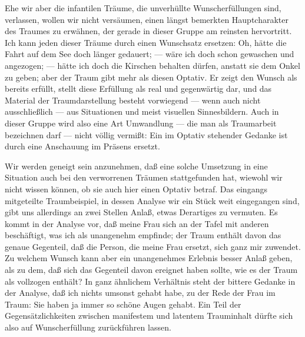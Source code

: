 \documentclass[twoside=true,titlepage=false,open=any, parskip=never, fontsize=10pt, headings=small, chapterprefix=false, appendixprefix=false]{scrbook}
\begin{document}
         
            
            
            
        \pstart
        Ehe wir aber die infantilen Träume, die unverhüllte Wunscherfüllungen
               sind, verlassen, wollen wir nicht versäumen, einen längst bemerkten
               Hauptcharakter des Traumes zu erwähnen, der gerade in dieser Gruppe am reinsten
               hervortritt. Ich kann jeden dieser Träume durch einen Wunschsatz ersetzen: Oh,
               hätte die Fahrt auf dem See doch länger gedauert; — wäre ich doch schon
               gewaschen und angezogen; — hätte ich doch die Kirschen behalten dürfen, anstatt
               sie dem Onkel zu geben; aber der Traum gibt mehr als diesen Optativ. Er zeigt
               den Wunsch als bereits erfüllt, stellt diese Erfüllung als real und gegenwärtig
               dar, und das Material der Traumdarstellung besteht vorwiegend — wenn auch
               nicht ausschließlich — aus Situationen und meist visuellen Sinnesbildern. Auch
               in dieser Gruppe wird also eine Art Umwandlung — die man als Traumarbeit
               bezeichnen darf — nicht völlig vermißt: Ein im
                  Optativ stehender Gedanke ist durch eine Anschauung im Präsens ersetzt.
        \pend
    
         
            
            
            \pstart{}\pend
            
        \pstart
        Wir werden geneigt sein anzunehmen, daß eine solche Umsetzung in eine
               Situation auch bei den verworrenen Träumen stattgefunden hat, wiewohl wir nicht
               wissen können, ob sie auch hier einen Optativ betraf. Das eingangs mitgeteilte
                  Traumbeispiel, in dessen Analyse wir ein Stück weit eingegangen
               sind, gibt uns allerdings an zwei Stellen Anlaß, etwas Derartiges zu
               vermuten. Es kommt in der Analyse vor, daß meine Frau sich an der Tafel mit
               anderen beschäftigt, was ich als unangenehm empfinde; der Traum enthält davon
               das genaue Gegenteil, daß die Person, die meine
               Frau ersetzt, sich ganz mir zuwendet. Zu welchem Wunsch kann aber ein
               unangenehmes Erlebnis besser Anlaß geben, als zu dem, daß sich das Gegenteil
               davon ereignet haben sollte, wie es der Traum als vollzogen enthält? In
               ganz ähnlichem Verhältnis steht der bittere Gedanke in der Analyse, daß ich
               nichts umsonst gehabt habe, zu der Rede der Frau im Traum: Sie haben ja immer so
               schöne Augen gehabt. Ein Teil der Gegensätzlichkeiten zwischen manifestem
               und latentem Trauminhalt dürfte sich also auf Wunscherfüllung zurückführen
               lassen.
        \pend
    
\end{document}
